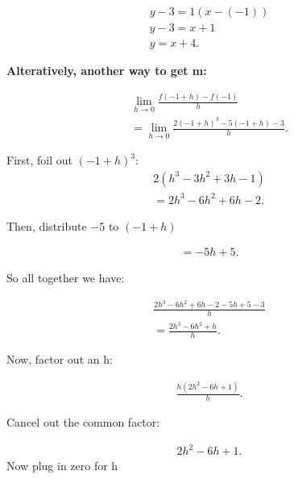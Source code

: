 \documentclass{report}
\begin{document}
        \begin{align*}
            y-3 = 1 \left(x- \left(-1\right)\right) \\ 
            y - 3 = x + 1 \\ 
            y = x + 4
        .\end{align*}

        \bigbreak \noindent \bigbreak \noindent 
        \begin{large}
            \textbf{Alteratively, another way to get m:}
        \end{large}

        \begin{align*}
            \lim\limits_{h \to 0}{ \frac{f \left(-1+h\right) - f\left(-1\right)}{h}} \\ 
            = \lim\limits_{h \to 0}{ \frac{2 \left(-1+h\right)^3 - 5 \left(-1+h\right) - 3}{h}}
        .\end{align*}

        \bigbreak \noindent 
        First, foil out $(-1+h)^3$:
        \begin{align*}
            2 \left(h^3 - 3h^2 + 3h -1\right) \\ 
            = 2h^3 - 6h^2 + 6h -2
        .\end{align*}

        \bigbreak \noindent 
        Then, distribute $-5$ to $(-1+h)$

        \begin{align*}
            = -5h + 5
        .\end{align*}

        \bigbreak \noindent 
        So all together we have:

        \begin{align*}
            \frac{2h^3-6h^2+6h-2-5h+5-3}{h} \\ 
            = \frac{2h^3 -6h^2 + h}{h}
        .\end{align*}

        \bigbreak \noindent 
        Now, factor out an h:

        \begin{align*}
            \frac{h \left(2h^2-6h+1\right)}{h}  
        .\end{align*}

        \bigbreak \noindent 
        Cancel out the common factor:

        \begin{align*}
            2h^2-6h+1
        .\end{align*}
        \bigbreak \noindent 
        Now plug in zero for h 
\end{document}
